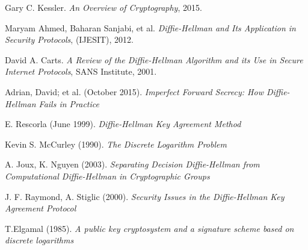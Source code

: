 \documentclass[a4paper]{article}
\begin{document}
\begin{thebibliography}{9}

 Gary C. Kessler. \emph{An Overview of Cryptography}, 2015.

 Maryam Ahmed, Baharan Sanjabi, et al. \emph{Diffie-Hellman and Its Application in Security Protocols}, (IJESIT), 2012.

 David A. Carts. \emph{A Review of the Diffie-Hellman Algorithm and its Use in Secure Internet Protocols}, SANS Institute, 2001.

 Adrian, David; et al. (October 2015). \emph{Imperfect Forward Secrecy: How Diffie-Hellman Fails in Practice}


 E. Rescorla (June 1999). \emph{Diffie-Hellman Key Agreement Method}

 Kevin S. McCurley (1990). \emph{The Discrete Logarithm Problem}

 A. Joux, K. Nguyen (2003). \emph{Separating Decision Diffie-Hellman from Computational Diffie-Hellman in Cryptographic Groups}

 J. F. Raymond, A. Stiglic (2000). \emph{Security Issues in the Diffie-Hellman Key Agreement Protocol}

 T.Elgamal (1985). \emph{A public key cryptosystem and a signature scheme based on discrete logarithms}


\end{thebibliography}


\end{document}
